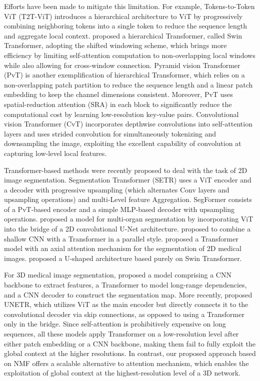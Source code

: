 \documentclass[a4,12pt]{article}
\begin{document}
	Efforts have been made to mitigate this limitation. For example, Tokens-to-Token ViT (T2T-ViT) \citep{yuan2021tokens} introduces a hierarchical architecture to ViT by progressively combining neighboring tokens into a single token to reduce the sequence length and aggregate local context. \citet{liu2021swin} proposed a hierarchical Transformer, called Swin Transformer, adopting the shifted windowing scheme, which brings more efficiency by limiting self-attention computation to non-overlapping local windows while also allowing for cross-window connection. Pyramid vision Transformer (PvT) \citep{wang2021pyramid} is another exemplification of hierarchical Transformer, which relies on a non-overlapping patch partition to reduce the sequence length and a linear patch embedding to keep the channel dimensions consistent. Moreover, PvT uses spatial-reduction attention (SRA) in each block to significantly reduce the computational cost by learning low-resolution key-value pairs. Convolutional vision Transformer (CvT) \citep{wu2021cvt} incorporates depthwise convolutions into self-attention layers and uses strided convolution for simultaneously tokenizing and downsampling the image, exploiting the excellent capability of convolution at capturing low-level local features.
	
	Transformer-based methods were recently proposed to deal with the task of 2D image segmentation. Segmentation Transformer (SETR) \citep{zheng2021rethinking} uses a ViT encoder and a decoder with progressive upsampling (which alternates Conv layers and upsampling operations) and multi-Level feature Aggregation. SegFormer \citep{xie2021segformer} consists of a PvT-based encoder and a simple MLP-based decoder with upsampling operations. \citet{chen2021transunet} proposed a model for multi-organ segmentation by incorporating ViT into the bridge of a 2D convolutional U-Net architecture. \citet{zhang2021transfuse} proposed to combine a shallow CNN with a Transformer in a parallel style. \citet{valanarasu2021medical} proposed a Transformer model with an axial attention mechanism for the segmentation of 2D medical images. \citet{cao2021swin} proposed a U-shaped architecture based purely on Swin Transformer.
	
	For 3D medical image segmentation, \citet{xie2021cotr} proposed a model comprising a CNN backbone to extract features, a Transformer to model long-range dependencies, and a CNN decoder to construct the segmentation map. More recently, \citet{hatamizadeh2022unetr} proposed UNETR, which utilizes ViT as the main encoder but directly connects it to the convolutional decoder via skip connections, as opposed to using a Transformer only in the bridge. Since self-attention is prohibitively expensive on long sequences, all these models apply Transformer on a low-resolution level after either patch embedding or a CNN backbone, making them fail to fully exploit the global context at the higher resolutions. In contrast, our proposed approach based on NMF offers a scalable alternative to attention mechanism, which enables the exploitation of global context at the highest-resolution level of a 3D network.
	
\end{document}
